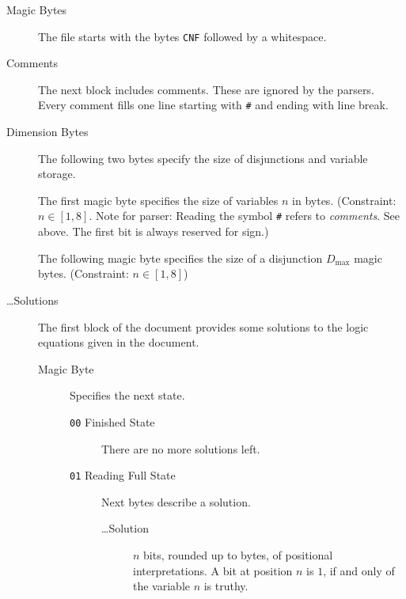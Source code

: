 \documentclass[12pt, letterpaper]{article}
\begin{document}
    \begin{description}
		\item[Magic Bytes]
		
		The file starts with the bytes \texttt{CNF}
		followed by a whitespace.

		\item[Comments]
		
		The next block includes comments. These are
		ignored by the parsers. Every comment fills
		one line starting with \texttt{\#} and ending
		with line break.

		\item[Dimension Bytes]
		
		The following two bytes specify the size of
		disjunctions and variable storage.

		The first magic byte specifies the size of
		variables $n$ in bytes. (Constraint: $n \in
		[1,8]$. Note for parser: Reading the symbol
		\texttt{\#} refers to \emph{comments}. See
		above. The first bit is always reserved for
		sign.)

		The following magic byte specifies the size
		of a disjunction $D_\text{max}$ magic bytes.
		(Constraint: $n \in [1,8]$)

		\item[\ldots Solutions]
		
		The first block of the document provides some
		solutions to the logic equations given in the 
		document.

		\begin{description}
			\item[Magic Byte]
			
			Specifies the next state.

			\begin{description}

				\item[\texttt{00} Finished State]
				
				There are no more solutions
				left.

				\item[\texttt{01} Reading Full State]
				
				Next bytes describe a solution.

				\begin{description}
					
					\item[\ldots Solution]
					
					$n$ bits, rounded up to bytes, of
					positional interpretations. A bit
					at position $n$ is $1$, if and
					only of the variable $n$ is truthy.


\end{description}
\end{description}
\end{description}
\end{description}
\end{document}
